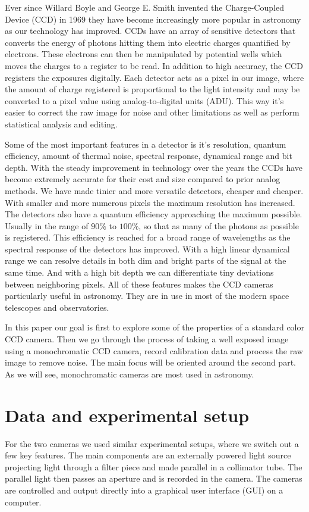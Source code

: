 \documentclass{emulateapj}
\begin{document}
Ever since Willard Boyle and George E. Smith invented the Charge-Coupled Device (CCD) in 1969 \citep{PattentCCD} they have become increasingly more popular in astronomy as our technology has improved. CCDs have an array of sensitive detectors that converts the energy of photons hitting them into electric charges quantified by electrons. These electrons can then be manipulated by potential wells which moves the charges to a register to be read. In addition to high accuracy, the CCD registers the exposures digitally. Each detector acts as a pixel in our image, where the amount of charge registered is proportional to the light intensity and may be converted to a pixel value using analog-to-digital units (ADU). This way it's easier to correct the raw image for noise and other limitations as well as perform statistical analysis and editing.

Some of the most important features in a detector is it's resolution, quantum efficiency, amount of thermal noise, spectral response, dynamical range and bit depth. With the steady improvement in technology over the years the CCDs have become extremely accurate for their cost and size compared to prior analog methods. We have made tinier and more versatile detectors, cheaper and cheaper. With smaller and more numerous pixels the maximum resolution has increased. The detectors also have a quantum efficiency approaching the maximum possible. Usually in the range of $90\%$ to $100\%$, so that as many of the photons as possible is registered. This efficiency is reached for a broad range of wavelengths as the spectral response of the detectors has improved. With a high linear dynamical range we can resolve details in both dim and bright parts of the signal at the same time. And with a high bit depth we can differentiate tiny deviations between neighboring pixels. All of these features makes the CCD cameras particularly useful in astronomy. They are in use in most of the modern space telescopes and observatories. 

In this paper our goal is first to explore some of the properties of a standard color CCD camera. Then we go through the process of taking a well exposed image using a monochromatic CCD camera, record calibration data and process the raw image to remove noise. The main focus will be oriented around the second part. As we will see, monochromatic cameras are most used in astronomy.

\section{Data and experimental setup}
\label{sec:data}
For the two cameras we used similar experimental setups, where we switch out a few key features. The main components are an externally powered light source projecting light through a filter piece and made parallel in a collimator tube. The parallel light then passes an aperture and is recorded in the camera. The cameras are controlled and output directly into a graphical user interface (GUI) on a computer.
\end{document}
